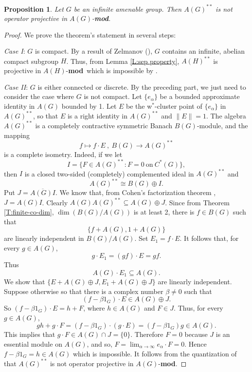 \documentclass[10pt]{amsart}
\newtheorem{prop}[thm]{Proposition}
\numberwithin{thm}{section}
\numberwithin{equation}{section}
\begin{document}
\begin{prop}\label{P:second dual-amenable}
Let $G$ be an infinite amenable group. Then $A(G)^{**}$ is not operator projective in $A(G)$-{\textbf{mod}}.
\end{prop}

\begin{proof}
We prove the theorem's statement in several steps:

{\it Case I}: $G$ is compact. By a result of Zelmanov (\cite{Z}), $G$ contains an infinite, abelian compact 
subgroup $H$. Thus, from Lemma \ref{L:sep property}, $A(H)^{**}$ is projective in $A(H)$-{\textbf{mod}}\ which is impossible 
by \cite[Theorem 2.7]{DP04}.

{\it Case II}: $G$ is either connected or discrete. By the preceding part, we just need to 
consider the case where $G$ is not compact. Let $\{e_\alpha \}$ be a bounded approximate identity
in $A(G)$ bounded by 1. Let $E$ be the w$^*$-cluster point of $\{e_\alpha \}$ in $A(G)^{**}$, so 
that $E$ is a right identity in $A(G)^{**}$ and $\|E\|=1$. The algebra $A(G)^{**}$ is a completely
contractive symmetric Banach $B(G)$-module, and the mapping 
$$ f\mapsto f\cdot E \ , \ B(G) \to A(G)^{**}$$
is a complete isometry. Indeed, if we let 
$$I=\{ F\in A(G)^{**} : F=0 \ \text{on} \ C^*(G) \},$$
then $I$ is a closed two-sided (completely) complemented ideal in $A(G)^{**}$ and
$$A(G)^{**}\cong B(G)\oplus I.$$   
Put $J=\overline{A(G)I}$. We know that, from Cohen's factorization theorem 
\cite[Corollary 2.9.26]{D}, $J=A(G)I$. Clearly $A(G)A(G)^{**}\subseteq A(G)\oplus J$. 
Since from Theorem 
\ref{T:finite-co-dim}, $\dim (B(G)/A(G))$ is at least 2, there is $f\in B(G)$ such that 
$$\{f+A(G) , 1+A(G)\}$$ are linearly independent in $B(G)/A(G)$. Set $E_1=f\cdot E$. It follows that,
for every $g\in A(G)$,
$$ g\cdot E_1=(gf)\cdot E=gf.$$
Thus
$$ A(G)\cdot E_1 \subseteq A(G).$$
We show that $\{E+A(G)\oplus J , E_1+A(G)\oplus J\}$ are linearly independent. Suppose otherwise
so that there is a complex number $\beta\neq 0$ such that
$$(f-\beta 1_G)\cdot E \in A(G)\oplus J.$$ 
So $(f-\beta 1_G)\cdot E=h+F$, where $h\in A(G)$ and $F\in J$. Thus, for every $g\in A(G)$,
$$gh+g\cdot F=(f-\beta 1_G)\cdot (g\cdot E)=(f-\beta 1_G)g \in A(G).$$
This implies that $g\cdot F\in A(G)\cap J=\{0\}$. Therefore $F=0$ because
$J$ is an essential module on $A(G)$, and so, $F=\lim_{\alpha \to \infty} e_\alpha \cdot F=0$.
Hence $f-\beta 1_G=h \in A(G)$ which is impossible. It follows from the quantization of 
\cite[Corollary 1.4]{DP04} that $A(G)^{**}$ is not operator projective in $A(G)$-{\textbf{mod}}.


\end{proof}
\end{document}
